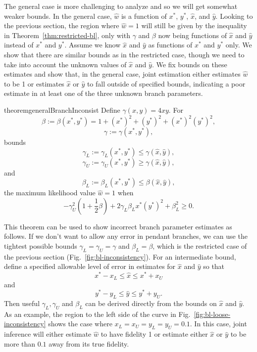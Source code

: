 \documentclass{article}
\begin{document}
The general case is more challenging to analyze and so we will get somewhat weaker bounds.
In the general case, $\hat{w}$ is a function of $x^*$, $y^*$, $\hat{x}$, and $\hat{y}$.
Looking to the previous section, the region where $\hat{w}=1$ will still be given by the inequality in Theorem~\ref{thm:restricted-bl}, only with $\gamma$ and $\beta$ now being functions of $\hat{x}$ and $\hat{y}$ instead of $x^*$ and $y^*$.
Assume we know $\hat{x}$ and $\hat{y}$ as functions of $x^*$ and $y^*$ only.
We show that there are similar bounds as in the restricted case, though we need to take into account the unknown values of $\hat{x}$ and $\hat{y}$.
We fix bounds on these estimates and show that, in the general case, joint estimation either estimates $\hat{w}$ to be 1 or estimates $\hat{x}$ or $\hat{y}$ to fall outside of specified bounds, indicating a poor estimate in at least one of the three unknown branch parameters.
\begin{restatable}{theorem}{generalBranchInconsist}
\label{thm:general-bl}
Define $\gamma(x, y) = 4xy$.
For
$$
\beta := \beta(x^*, y^*) = 1+(x^*)^2+(y^*)^2+(x^*)^2(y^*)^2,
$$
$$
\gamma := \gamma(x^*, y^*),
$$
bounds
$$
\gamma_L := \gamma_{L}(x^*, y^*) \le \gamma(\hat{x}, \hat{y}),
$$
$$
\gamma_U := \gamma_{U}(x^*, y^*) \ge \gamma(\hat{x}, \hat{y}),
$$
and
$$
\beta_L := \beta_{L}(x^*, y^*) \le \beta(\hat{x}, \hat{y}),
$$
the maximum likelihood value $\hat{w}=1$ when
$$
-\gamma_{U}^2\left(1 + \frac{1}{2}\beta\right) + 2\gamma_{L}\beta_{L}x^*(y^*)^2 + \beta_{L}^2 \ge 0.
$$
\end{restatable}
This theorem can be used to show incorrect branch parameter estimates as follows.
If we don't want to allow any error in pendant branches, we can use the tightest possible bounds $\gamma_{L} = \gamma_{U} = \gamma$ and $\beta_{L} = \beta$, which is the restricted case of the previous section (Fig.~\ref{fig:bl-inconsistency}).
For an intermediate bound, define a specified allowable level of error in estimates for $\hat{x}$ and $\hat{y}$ so that
$$
x^*-x_{L} \le \hat{x} \le x^*+x_{U}
$$
and
$$
y^*-y_{L} \le \hat{y} \le y^*+y_{U}.
$$
Then useful $\gamma_L, \gamma_U$ and $\beta_L$ can be derived directly from the bounds on $\hat{x}$ and $\hat{y}$.
As an example, the region to the left side of the curve in Fig.~\ref{fig:bl-loose-inconsistency} shows the case where $x_L=x_U=y_L=y_U=0.1$.
In this case, joint inference will either estimate $\hat{w}$ to have fidelity 1 or estimate either $\hat{x}$ or $\hat{y}$ to be more than $0.1$ away from its true fidelity.
\end{document}

